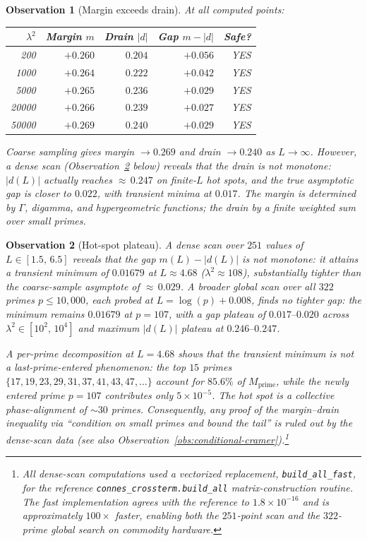 \documentclass[11pt,a4paper]{article}
\newtheorem{observation}{Observation}[section]
\begin{document}
\begin{observation}[Margin exceeds drain]\label{obs:margin-drain}
At all computed points:
\begin{center}
\begin{tabular}{rrrrr}
\toprule
$\lambda^2$ & Margin $m$ & Drain $|d|$ & Gap $m - |d|$ & Safe? \\
\midrule
200 & $+0.260$ & $0.204$ & $+0.056$ & YES \\
1000 & $+0.264$ & $0.222$ & $+0.042$ & YES \\
5000 & $+0.265$ & $0.236$ & $+0.029$ & YES \\
20000 & $+0.266$ & $0.239$ & $+0.027$ & YES \\
50000 & $+0.269$ & $0.240$ & $+0.029$ & YES \\
\bottomrule
\end{tabular}
\end{center}
Coarse sampling gives margin $\to 0.269$ and drain $\to 0.240$ as $L \to \infty$. However, a dense scan (Observation~\ref{obs:hot-spot-plateau} below) reveals that the drain is not monotone: $|d(L)|$ actually reaches ${\approx}\,0.247$ on finite-$L$ hot spots, and the true asymptotic gap is closer to $0.022$, with transient minima at $0.017$. The margin is determined by $\Gamma$, digamma, and hypergeometric functions; the drain by a finite weighted sum over small primes.
\end{observation}

\begin{observation}[Hot-spot plateau]\label{obs:hot-spot-plateau}
A dense scan over $251$ values of $L \in [1.5,\, 6.5]$ reveals that the gap $m(L) - |d(L)|$ is not monotone: it attains a transient minimum of $0.01679$ at $L \approx 4.68$ ($\lambda^2 \approx 108$), substantially tighter than the coarse-sample asymptote of ${\approx}\,0.029$. A broader global scan over all $322$ primes $p \le 10{,}000$, each probed at $L = \log(p) + 0.008$, finds no tighter gap: the minimum remains $0.01679$ at $p=107$, with a gap plateau of $0.017\text{--}0.020$ across $\lambda^2 \in [10^2,\, 10^4]$ and maximum $|d(L)|$ plateau at $0.246\text{--}0.247$.

A per-prime decomposition at $L = 4.68$ shows that the transient minimum is not a last-prime-entered phenomenon: the top $15$ primes $\{17, 19, 23, 29, 31, 37, 41, 43, 47, \ldots\}$ account for $85.6\%$ of $M_{\mathrm{prime}}$, while the newly entered prime $p=107$ contributes only $5 \times 10^{-5}$. The hot spot is a collective phase-alignment of ${\sim}30$ primes. Consequently, any proof of the margin--drain inequality via ``condition on small primes and bound the tail'' is ruled out by the dense-scan data (see also Observation~\ref{obs:conditional-cramer}).\footnote{All dense-scan computations used a vectorized replacement, \texttt{build\_all\_fast}, for the reference \texttt{connes\_crossterm.build\_all} matrix-construction routine. The fast implementation agrees with the reference to $1.8 \times 10^{-16}$ and is approximately $100\times$ faster, enabling both the $251$-point scan and the $322$-prime global search on commodity hardware.}
\end{observation}
\end{document}
